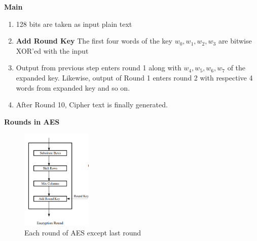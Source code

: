 \documentclass[a4paper]{report} %
\begin{document}
\begin{center}
    \textbf{Main}
\end{center}
\begin{enumerate}
    \item 128 bits are taken as input plain text 
    \item \textbf{Add Round Key} The first four words of the key $w_0, w_1, w_2, w_3$ are bitwise XOR’ed with the input 
    \item Output from previous step enters round 1 along with $w_4, w_5, w_6, w_7$ of the expanded key. Likewise, output of Round 1 enters round 2 with respective 4 words from expanded key and so on. 
    \item After Round 10, Cipher text is finally generated. 
\end{enumerate}
\begin{center}
    \textbf{Rounds in AES}
\end{center}

\begin{figure}[ht]
\centering
\includegraphics[width=0.3\textwidth]{images/Round_AES.PNG}
\caption{Each round of AES except last round}
\end{figure}
\end{document}
